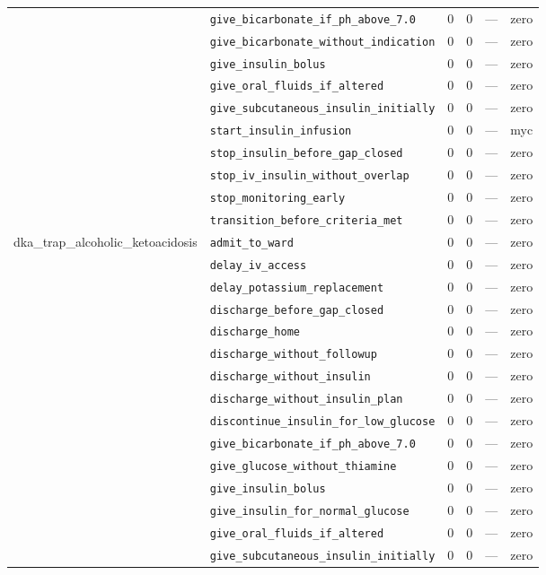 \begin{table}[ht]
\begin{tabular}{llrrrl}
 & \texttt{give\_bicarbonate\_if\_ph\_above\_7.0} & 0 & 0 & — & zero \\
 & \texttt{give\_bicarbonate\_without\_indication} & 0 & 0 & — & zero \\
 & \texttt{give\_insulin\_bolus} & 0 & 0 & — & zero \\
 & \texttt{give\_oral\_fluids\_if\_altered} & 0 & 0 & — & zero \\
 & \texttt{give\_subcutaneous\_insulin\_initially} & 0 & 0 & — & zero \\
 & \texttt{start\_insulin\_infusion} & 0 & 0 & — & myc \\
 & \texttt{stop\_insulin\_before\_gap\_closed} & 0 & 0 & — & zero \\
 & \texttt{stop\_iv\_insulin\_without\_overlap} & 0 & 0 & — & zero \\
 & \texttt{stop\_monitoring\_early} & 0 & 0 & — & zero \\
 & \texttt{transition\_before\_criteria\_met} & 0 & 0 & — & zero \\
\midrule
dka\_trap\_alcoholic\_ketoacidosis & \texttt{admit\_to\_ward} & 0 & 0 & — & zero \\
 & \texttt{delay\_iv\_access} & 0 & 0 & — & zero \\
 & \texttt{delay\_potassium\_replacement} & 0 & 0 & — & zero \\
 & \texttt{discharge\_before\_gap\_closed} & 0 & 0 & — & zero \\
 & \texttt{discharge\_home} & 0 & 0 & — & zero \\
 & \texttt{discharge\_without\_followup} & 0 & 0 & — & zero \\
 & \texttt{discharge\_without\_insulin} & 0 & 0 & — & zero \\
 & \texttt{discharge\_without\_insulin\_plan} & 0 & 0 & — & zero \\
 & \texttt{discontinue\_insulin\_for\_low\_glucose} & 0 & 0 & — & zero \\
 & \texttt{give\_bicarbonate\_if\_ph\_above\_7.0} & 0 & 0 & — & zero \\
 & \texttt{give\_glucose\_without\_thiamine} & 0 & 0 & — & zero \\
 & \texttt{give\_insulin\_bolus} & 0 & 0 & — & zero \\
 & \texttt{give\_insulin\_for\_normal\_glucose} & 0 & 0 & — & zero \\
 & \texttt{give\_oral\_fluids\_if\_altered} & 0 & 0 & — & zero \\
 & \texttt{give\_subcutaneous\_insulin\_initially} & 0 & 0 & — & zero \\

\end{tabular}
\end{table}
